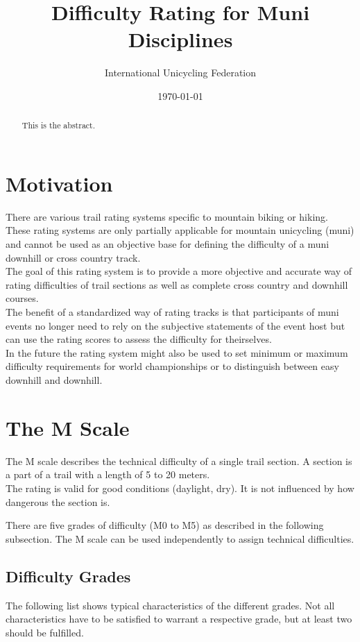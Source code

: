 \documentclass[a4paper,oneside]{scrartcl}
\title{Difficulty Rating for Muni Disciplines}
\author{International Unicycling Federation}
\date{\today}
\begin{document}
\maketitle

\begin{abstract}
This is the abstract.
\end{abstract}

\newpage

\tableofcontents
\newpage

\section{Motivation}

There are various trail rating systems specific to mountain biking or hiking.
These rating systems are only partially applicable for mountain unicycling (muni)
and cannot be used as an objective base for defining the difficulty of a muni
downhill or cross country track.\\
The goal of this rating system is to provide a more objective and accurate way
of rating difficulties of trail sections as well as complete cross country and
downhill courses.\\
The benefit of a standardized way of rating tracks is that participants of muni
events no longer need to rely on the subjective statements of the event host but
can use the rating scores to assess the difficulty for theirselves.\\
In the future the rating system might also be used to set minimum or maximum
difficulty requirements for world championships or to distinguish between 
easy downhill and downhill.



\section{The M Scale}
\label{sec:difficulty-m-scale}

The M scale describes the technical difficulty of a single trail section. A
section is a part of a trail with a length of 5 to 20 meters.\\
The rating is valid for good conditions (daylight, dry). It is not influenced by how dangerous
the section is.

There are five grades of difficulty (M0 to M5) as described in the following
subsection. The M scale can be used independently to assign technical difficulties.

\subsection{Difficulty Grades}
\label{sec:m-scale-levels}
The following list shows typical characteristics of the different grades. Not all
characteristics have to be satisfied to warrant a respective grade, but at least
two should be fulfilled.
\end{document}
